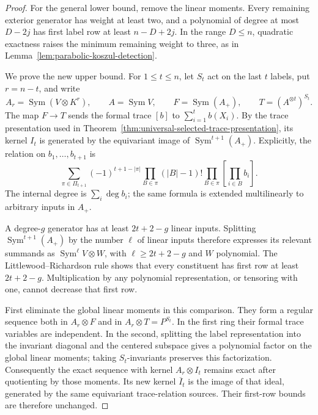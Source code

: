 \begin{proof}
For the general lower bound, remove the linear moments.  Every
remaining exterior generator has weight at least two, and a
polynomial of degree at most $D-2j$ has first label row at least
$n-D+2j$.  In the range $D\le n$, quadratic exactness raises the
minimum remaining weight to three, as in
Lemma~\ref{lem:parabolic-koszul-detection}.

We prove the new upper bound.  For $1\le t\le n$, let $S_t$
act on the last $t$ labels, put $r=n-t$, and write
\[
 A_r=\operatorname{Sym}(V\otimes K^r),\qquad
 A=\operatorname{Sym}V,\qquad
 F=\operatorname{Sym}(A_+),\qquad
 T=(A^{\otimes t})^{S_t}.
\]
The map $F\to T$ sends the formal trace $[b]$ to
$\sum_{i=1}^t b(X_i)$.  By the trace presentation used in
Theorem~\ref{thm:universal-selected-trace-presentation}, its kernel
$I_t$ is generated by the equivariant image of
$\operatorname{Sym}^{t+1}(A_+)$.  Explicitly, the relation on
$b_1,\ldots,b_{t+1}$ is
\[
 \sum_{\pi\in\Pi_{t+1}}
 (-1)^{t+1-|\pi|}
 \prod_{B\in\pi}(|B|-1)!
 \prod_{B\in\pi}\left[\prod_{i\in B}b_i\right].
\]
The internal degree is $\sum_i\deg b_i$; the same formula is
extended multilinearly to arbitrary inputs in $A_+$.

A degree-$g$ generator has at least $2t+2-g$ linear inputs.
Splitting $\operatorname{Sym}^{t+1}(A_+)$ by the number $\ell$
of linear inputs therefore expresses its relevant summands as
$\operatorname{Sym}^{\ell}V\otimes W$, with
$\ell\ge2t+2-g$ and $W$ polynomial.  The
Littlewood--Richardson rule shows that every constituent has first
row at least $2t+2-g$.  Multiplication by any polynomial
representation, or tensoring with one, cannot decrease that first
row.  

First eliminate the global linear moments in this comparison.
They form a regular sequence both in $A_r\otimes F$ and in
$A_r\otimes T=P^{S_t}$.  In the first ring their formal trace
variables are independent.  In the second, splitting the label
representation into the invariant diagonal and the centered
subspace gives a polynomial factor on the global linear moments;
taking $S_t$-invariants preserves this factorization.
Consequently the exact sequence with kernel $A_r\otimes I_t$
remains exact after quotienting by those moments.  Its new kernel
$\overline I_t$ is the image of that ideal, generated by the same
equivariant trace-relation sources.  Their first-row bounds are
therefore unchanged.


\end{proof}
